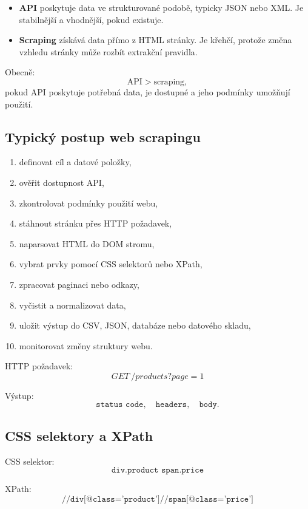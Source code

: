 \begin{itemize}
    \item \textbf{API} poskytuje data ve strukturované podobě, typicky JSON nebo XML.
    Je stabilnější a vhodnější, pokud existuje.
    
    \item \textbf{Scraping} získává data přímo z HTML stránky. Je křehčí, protože změna vzhledu stránky může
    rozbít extrakční pravidla.
\end{itemize}

Obecně:
\[
\text{API} > \text{scraping},
\]
pokud API poskytuje potřebná data, je dostupné a jeho podmínky umožňují použití.

\subsection{Typický postup web scrapingu}

\begin{enumerate}
    \item definovat cíl a datové položky,
    \item ověřit dostupnost API,
    \item zkontrolovat podmínky použití webu,
    \item stáhnout stránku přes HTTP požadavek,
    \item naparsovat HTML do DOM stromu,
    \item vybrat prvky pomocí CSS selektorů nebo XPath,
    \item zpracovat paginaci nebo odkazy,
    \item vyčistit a normalizovat data,
    \item uložit výstup do CSV, JSON, databáze nebo datového skladu,
    \item monitorovat změny struktury webu.
\end{enumerate}

HTTP požadavek:
\[
GET\ /products?page=1
\]

Výstup:
\[
\texttt{status code},\quad \texttt{headers},\quad \texttt{body}.
\]

\subsection{CSS selektory a XPath}

CSS selektor:
\[
\texttt{div.product span.price}
\]

XPath:
\[
\texttt{//div[@class='product']//span[@class='price']}
\]

